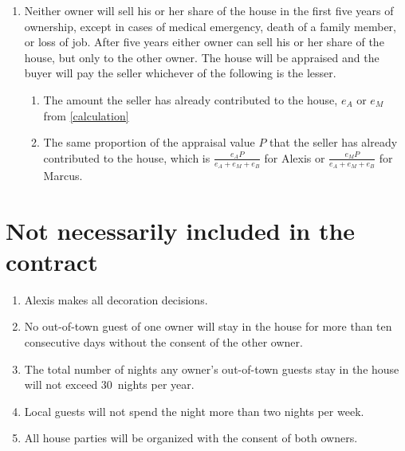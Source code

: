 \documentclass[12pt]{article}
\begin{document}
\begin{enumerate}
\item Neither owner will sell his or her share of the house in the 
first five years of ownership, except in cases of medical emergency, 
death of a family member, or loss of job. After five years either 
owner can sell his or her share of the house, but only
to the other owner. The house will be appraised and the 
buyer will pay the seller whichever of the following is the lesser. 

\begin{enumerate} \item The amount the seller has already contributed 
to the house, $e_A$ or $e_M$ from \autoref{calculation}

\item The same proportion 
of the appraisal value $P$ that the seller has already contributed to the 
house, which is $\frac{e_AP}{e_A+e_M+e_B}$ for Alexis or
$\frac{e_MP}{e_A+e_M+e_B}$ for Marcus.

\end{enumerate} 
\end{enumerate}

\section{Not necessarily included in the contract}
\begin{enumerate}

\item Alexis makes all decoration decisions.

\item No out-of-town guest of one owner will stay in the house for 
more than ten consecutive days without the consent of the 
other owner.

\item The total number of nights any owner's out-of-town guests stay 
in the house will not exceed 30~nights per year.

\item Local guests will not spend the night more than two nights per 
week.

\item All house parties will be organized with the consent of both 
owners.

\end{enumerate}
\end{document}
